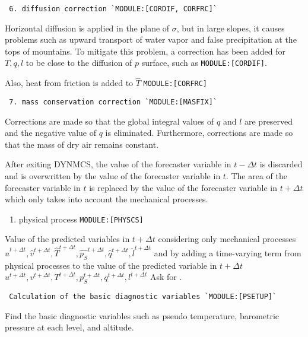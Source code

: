 \begin{verbatim}
 6. diffusion correction `MODULE:[CORDIF, CORFRC]`
\end{verbatim}

Horizontal diffusion is applied in the plane of \(\sigma\), but in large
slopes, it causes problems such as upward transport of water vapor and
false precipitation at the tops of mountains. To mitigate this problem,
a correction has been added for \(T,q,l\) to be close to the diffusion
of \(p\) surface, such as \texttt{MODULE:{[}CORDIF{]}}.

Also, heat from friction is added to \(\hat{T}\)
\texttt{MODULE:{[}CORFRC{]}}

\begin{verbatim}
 7. mass conservation correction `MODULE:[MASFIX]`
\end{verbatim}

Corrections are made so that the global integral values of \(q\) and
\(l\) are preserved and the negative value of \(q\) is eliminated.
Furthermore, corrections are made so that the mass of dry air remains
constant.

After exiting DYNMCS, the value of the forecaster variable in
\(t-\Delta t\) is discarded and is overwritten by the value of the
forecaster variable in \(t\). The area of the forecaster variable in
\(t\) is replaced by the value of the forecaster variable in
\(t+\Delta t\) which only takes into account the mechanical processes.

\begin{enumerate}
\def\labelenumi{\arabic{enumi}.}
\setcounter{enumi}{4}
\tightlist
\item
  physical process \texttt{MODULE:{[}PHYSCS{]}}
\end{enumerate}

Value of the predicted variables in \(t+\Delta t\) considering only
mechanical processes
\(\hat{u}^{t+\Delta t}, \hat{v}^{t+\Delta t}, \hat{T}^{t+\Delta t}, \hat{p_S}^{t+\Delta t}, \hat{q}^{t+\Delta t}, \hat{l}^{t+\Delta t}\)
and by adding a time-varying term from physical processes to the value
of the predicted variable in \(t+\Delta t\)
\(u^{t+\Delta t}, v^{t+\Delta t}, T^{t+\Delta t}, p_S^{t+\Delta t}, q^{t+\Delta t}, l^{t+\Delta t}\)
Ask for .

\begin{verbatim}
 Calculation of the basic diagnostic variables `MODULE:[PSETUP]`
\end{verbatim}

Find the basic diagnostic variables such as pseudo temperature,
barometric pressure at each level, and altitude.

